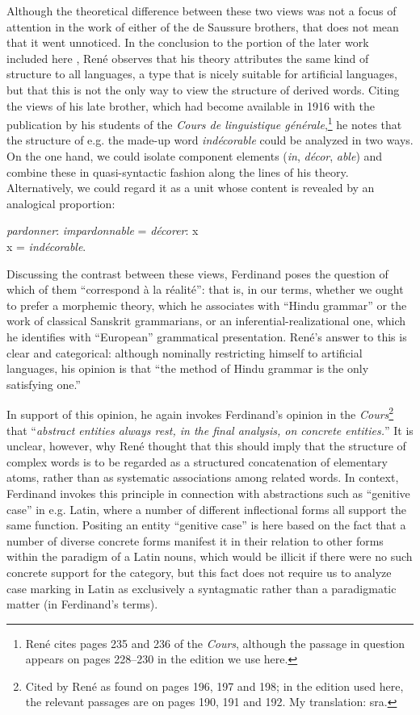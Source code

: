 \documentclass[output=paper]{langsci/langscibook}
\begin{document}
Although the theoretical difference between these two views was not a
focus of attention in the work of either of the de Saussure brothers,
that does not mean that it went unnoticed. In the conclusion to the
portion of the later work included here
\citep[27--28]{r.desaussure19:structure.logique}, Ren\'e observes that
his theory attributes the same kind of structure to all languages, a
type that is nicely suitable for artificial languages, but that this
is not the only way to view the structure of derived words. Citing the
views of his late brother, which had become available in 1916 with the
publication by his students of the \textsl{Cours de linguistique
  g\'en\'erale},\footnote{Ren\'e cites pages 235 and 236 of the
  \textsl{Cours}, although the passage in question appears on pages
  228--230 in the edition we use here.} he notes that the structure of
e.g. the made-up word \emph{indécorable} could be analyzed in two
ways. On the one hand, we could isolate component elements (\emph{in},
\emph{d\'ecor}, \emph{able}) and combine these in quasi-syntactic
fashion along the lines of his theory.  Alternatively, we could regard
it as a unit whose content is revealed by an analogical proportion:

\begin{center}
  \emph{pardonner}: \emph{impardonnable} = \emph{décorer}: x\\
  x = \emph{indécorable}.
\end{center}

Discussing the contrast between these views, Ferdinand poses the
question of which of them ``correspond \`a la r\'ealit\'e'': that is,
in our terms, whether we ought to prefer a morphemic theory, which he
associates with ``Hindu grammar'' or the work of classical Sanskrit
grammarians, or an inferential-realizational one, which he identifies
with ``European'' grammatical presentation.  Ren\'e's answer to this
is clear and categorical: although nominally restricting himself to
artificial languages, his opinion is that ``the method of Hindu
grammar is the only satisfying one.''

In support of this opinion, he again invokes Ferdinand's opinion in
the \textsl{Cours}\footnote{Cited by Ren\'e as found on pages 196, 197
  and 198; in the edition used here, the relevant passages are on
  pages 190, 191 and 192. My translation: sra. } that ``\emph{abstract
  entities always rest, in the final analysis, on concrete
  entities.}'' It is unclear, however, why Ren\'e thought that this
should imply that the structure of complex words is to be regarded as
a structured concatenation of elementary atoms, rather than as
systematic associations among related words. In context, Ferdinand
invokes this principle in connection with abstractions such as
``genitive case'' in e.g. Latin, where a number of different
inflectional forms all support the same function. Positing an entity
``genitive case'' is here based on the fact that a number of diverse
concrete forms manifest it in their relation to other forms within the
paradigm of a Latin nouns, which would be illicit if there were no
such concrete support for the category, but this fact does not require
us to analyze case marking in Latin as exclusively a syntagmatic
rather than a paradigmatic matter (in Ferdinand's terms).
\end{document}
